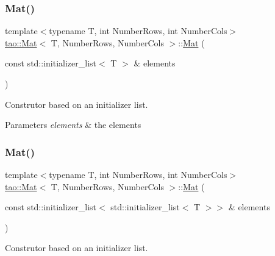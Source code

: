 \subsubsection{\texorpdfstring{Mat()}{Mat()}\hspace{0.1cm}{\footnotesize\ttfamily [2/3]}}
{\footnotesize\ttfamily template$<$typename T, int Number\+Rows, int Number\+Cols$>$ \\
\mbox{\hyperlink{classtao_1_1_mat}{tao\+::\+Mat}}$<$ T, Number\+Rows, Number\+Cols $>$\+::\mbox{\hyperlink{classtao_1_1_mat}{Mat}} (\begin{DoxyParamCaption}\item[{const std\+::initializer\+\_\+list$<$ T $>$ \&}]{elements }\end{DoxyParamCaption})\hspace{0.3cm}{\ttfamily [inline]}}



Construtor based on an initializer list. 


\begin{DoxyParams}{Parameters}
{\em elements} & the elements \\
\hline
\end{DoxyParams}
\mbox{\label{classtao_1_1_mat_a4e3a587a2d6466f391c4163dac1ddf24}} 
\subsubsection{\texorpdfstring{Mat()}{Mat()}\hspace{0.1cm}{\footnotesize\ttfamily [3/3]}}
{\footnotesize\ttfamily template$<$typename T, int Number\+Rows, int Number\+Cols$>$ \\
\mbox{\hyperlink{classtao_1_1_mat}{tao\+::\+Mat}}$<$ T, Number\+Rows, Number\+Cols $>$\+::\mbox{\hyperlink{classtao_1_1_mat}{Mat}} (\begin{DoxyParamCaption}\item[{const std\+::initializer\+\_\+list$<$ std\+::initializer\+\_\+list$<$ T $>$$>$ \&}]{elements }\end{DoxyParamCaption})\hspace{0.3cm}{\ttfamily [inline]}}



Construtor based on an initializer list. 


